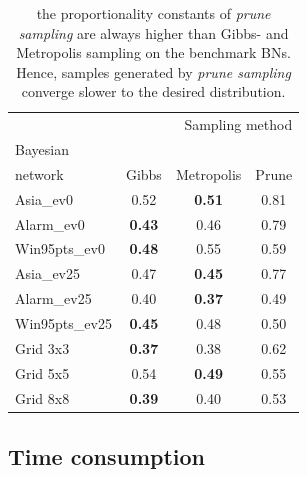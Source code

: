 \documentclass[a4paper, twoside, 11pt]{report}
\theoremstyle{plain}
\theoremstyle{definition}
\theoremstyle{remark}
\newcommand{\ps}{\textit{prune sampling }}
\begin{document}
\begin{center}
\begin{table}[H]
\begin{center}
\begin{tabular}{l c c c}  
\toprule
\multicolumn{4}{r}{Sampling method} \\
\cmidrule(r){2-4}
Bayesian \\ network    & Gibbs    & Metropolis & Prune  \\
\midrule
Asia\_ev0 & 0.52 & \textbf{0.51} & 0.81  \\
Alarm\_ev0 & \textbf{0.43} & 0.46 & 0.79  \\
Win95pts\_ev0 & \textbf{0.48} & 0.55 & 0.59  \\
Asia\_ev25 & 0.47 & \textbf{0.45} & 0.77  \\
Alarm\_ev25 & 0.40 & \textbf{0.37} & 0.49  \\
Win95pts\_ev25 & \textbf{0.45} & 0.48 & 0.50  \\
Grid 3x3 & \textbf{0.37} & 0.38 & 0.62  \\
Grid 5x5 & 0.54 & \textbf{0.49} & 0.55  \\
Grid 8x8 & \textbf{0.39} & 0.40 & 0.53  \\
\bottomrule
\end{tabular}
\caption{the proportionality constants of \ps are always higher than Gibbs- and Metropolis sampling on the benchmark BNs. Hence, samples generated by \ps converge slower to the desired distribution.}
\label{ROC-table}
\end{center}
\end{table}
\end{center}

\subsection{Time consumption}
\end{document}
